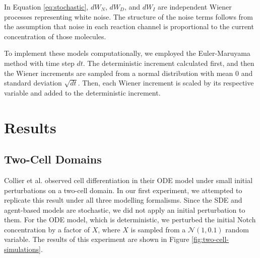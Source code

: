 \documentclass{article}
\begin{document}
\begin{flushleft}
In Equation \ref{eq:stochastic}, $dW_N$, $dW_D$, and $dW_I$ are independent Wiener processes representing white noise.
The structure of the noise terms follows from the assumption that noise in each reaction channel is proportional to the current concentration of those molecules.

\medskip

To implement these models computationally, we employed the Euler-Maruyama method with time step $dt$.
The deterministic increment calculated first, and then the Wiener increments are sampled from a normal distribution with mean $0$ and standard deviation $\sqrt{dt}$.
Then, each Wiener increment is scaled by its respective variable and added to the deterministic increment.

\section*{Results}


\subsection*{Two-Cell Domains}

Collier et al. \cite{collier_pattern_1996} observed cell differentiation in their ODE model under small initial perturbations on a two-cell domain.
In our first experiment, we attempted to replicate this result under all three modelling formalisms.
Since the SDE and agent-based models are stochastic, we did not apply an initial perturbation to them.
For the ODE model, which is deterministic, we perturbed the initial Notch concentration by a factor of $X$, where $X$ is sampled from a $\mathcal{N}(1, 0.1)$ random variable.
The results of this experiment are shown in Figure \ref{fig:two-cell-simulations}.


\end{flushleft}
\end{document}

